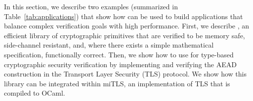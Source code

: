 \documentclass[acmsmall,review,anonymous]{acmart}\settopmatter{printfolios=true}
\begin{document}

  
In this section, we describe two examples (summarized in
Table~\ref{tab:applications}) that show how \lowstar can be used to
build applications that balance complex verification goals with high
performance.
%
First, we describe \haclstar{}, an efficient library of cryptographic
primitives that are verified to be memory safe, side-channel
resistant, and, where there exists a simple mathematical
specification, functionally correct.
%
%
Then, we show how to use \lowstar for type-based cryptographic
security verification by implementing and verifying the AEAD
construction in the Transport Layer Security (TLS) protocol.
%
We show how this \lowstar library can be integrated within miTLS, 
an \fstar implementation of TLS that is compiled to OCaml.
\end{document}

